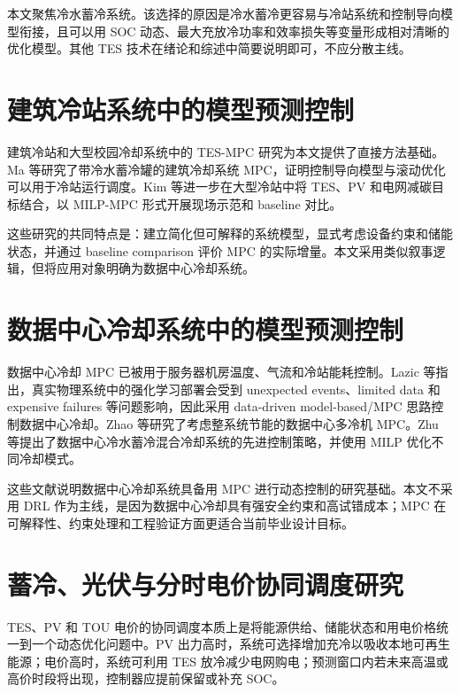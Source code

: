 \documentclass[UTF8,a4paper,12pt]{ctexrep}
\begin{document}
本文聚焦冷水蓄冷系统。该选择的原因是冷水蓄冷更容易与冷站系统和控制导向模型衔接，且可以用 SOC 动态、最大充放冷功率和效率损失等变量形成相对清晰的优化模型。其他 TES 技术在绪论和综述中简要说明即可，不应分散主线。

\section{建筑冷站系统中的模型预测控制}

建筑冷站和大型校园冷却系统中的 TES-MPC 研究为本文提供了直接方法基础。Ma 等研究了带冷水蓄冷罐的建筑冷却系统 MPC，证明控制导向模型与滚动优化可以用于冷站运行调度\citep{ma2009tesMpc,ma2010buildingCoolingMpc}。Kim 等进一步在大型冷站中将 TES、PV 和电网减碳目标结合，以 MILP-MPC 形式开展现场示范和 baseline 对比\citep{kim2022mpcTesPv}。

这些研究的共同特点是：建立简化但可解释的系统模型，显式考虑设备约束和储能状态，并通过 baseline comparison 评价 MPC 的实际增量。本文采用类似叙事逻辑，但将应用对象明确为数据中心冷却系统。

\section{数据中心冷却系统中的模型预测控制}

数据中心冷却 MPC 已被用于服务器机房温度、气流和冷站能耗控制。Lazic 等指出，真实物理系统中的强化学习部署会受到 unexpected events、limited data 和 expensive failures 等问题影响，因此采用 data-driven model-based/MPC 思路控制数据中心冷却\citep{lazic2018datacenterMpc}。Zhao 等研究了考虑整系统节能的数据中心多冷机 MPC\citep{zhao2024multiChillerMpc}。Zhu 等提出了数据中心冷水蓄冷混合冷却系统的先进控制策略，并使用 MILP 优化不同冷却模式\citep{zhu2024hybridCoolingStorage}。

这些文献说明数据中心冷却系统具备用 MPC 进行动态控制的研究基础。本文不采用 DRL 作为主线，是因为数据中心冷却具有强安全约束和高试错成本；MPC 在可解释性、约束处理和工程验证方面更适合当前毕业设计目标。

\section{蓄冷、光伏与分时电价协同调度研究}

TES、PV 和 TOU 电价的协同调度本质上是将能源供给、储能状态和用电价格统一到一个动态优化问题中。PV 出力高时，系统可选择增加充冷以吸收本地可再生能源；电价高时，系统可利用 TES 放冷减少电网购电；预测窗口内若未来高温或高价时段将出现，控制器应提前保留或补充 SOC。
\end{document}

